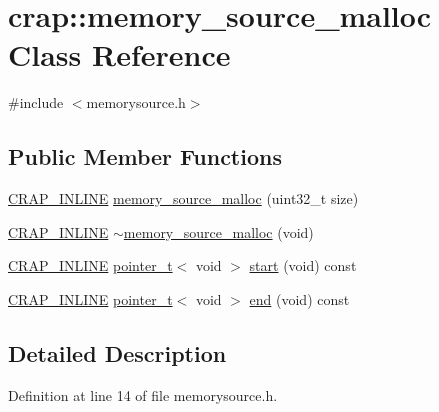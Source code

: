\hypertarget{classcrap_1_1memory__source__malloc}{\section{crap\+:\+:memory\+\_\+source\+\_\+malloc Class Reference}
\label{classcrap_1_1memory__source__malloc}
}


{\ttfamily \#include $<$memorysource.\+h$>$}

\subsection*{Public Member Functions}
\begin{DoxyCompactItemize}
\item 
\hyperlink{config__x86_8h_a5a40526b8d842e7ff731509998bb0f1c}{C\+R\+A\+P\+\_\+\+I\+N\+L\+I\+N\+E} \hyperlink{classcrap_1_1memory__source__malloc_adc6e8b7013733014f95f357168562418}{memory\+\_\+source\+\_\+malloc} (uint32\+\_\+t size)
\item 
\hyperlink{config__x86_8h_a5a40526b8d842e7ff731509998bb0f1c}{C\+R\+A\+P\+\_\+\+I\+N\+L\+I\+N\+E} \hyperlink{classcrap_1_1memory__source__malloc_a909ce07dcf5a78c6b2268b658a82cd23}{$\sim$memory\+\_\+source\+\_\+malloc} (void)
\item 
\hyperlink{config__x86_8h_a5a40526b8d842e7ff731509998bb0f1c}{C\+R\+A\+P\+\_\+\+I\+N\+L\+I\+N\+E} \hyperlink{structcrap_1_1pointer__t}{pointer\+\_\+t}$<$ void $>$ \hyperlink{classcrap_1_1memory__source__malloc_aa1f85681584482adc00fbe059ae36f37}{start} (void) const 
\item 
\hyperlink{config__x86_8h_a5a40526b8d842e7ff731509998bb0f1c}{C\+R\+A\+P\+\_\+\+I\+N\+L\+I\+N\+E} \hyperlink{structcrap_1_1pointer__t}{pointer\+\_\+t}$<$ void $>$ \hyperlink{classcrap_1_1memory__source__malloc_abe5c5d12c09886ad63cefb97a158a579}{end} (void) const 
\end{DoxyCompactItemize}


\subsection{Detailed Description}


Definition at line 14 of file memorysource.\+h.



